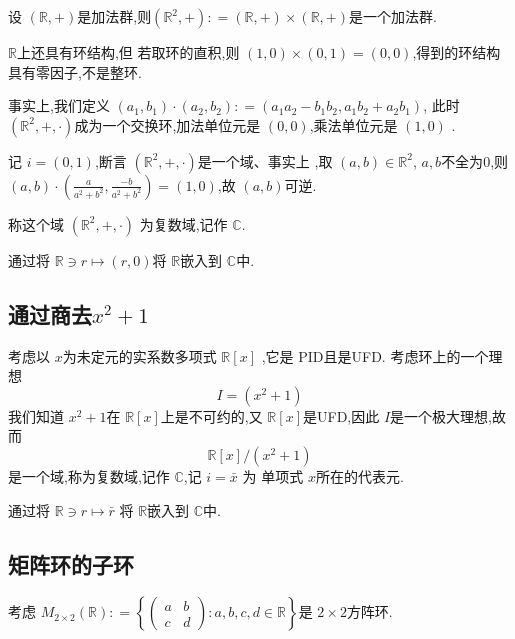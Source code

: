 \documentclass[../../复变函数.tex]{subfiles}
\begin{document}
设 \(  \left( \mathbb{R} ,+  \right)   \)是加法群,则\(  \left( \mathbb{R} ^{2},+  \right): =  \left( \mathbb{R} ,+  \right)\times \left( \mathbb{R} ,+  \right)     \)是一个加法群.  

 \(  \mathbb{R}   \)上还具有环结构,但 若取环的直积,则 \(  \left( 1,0 \right)\times \left( 0,1 \right)= \left( 0,0 \right)     \),得到的环结构具有零因子,不是整环. 

 事实上,我们定义 \(  \left( a_1,b_1 \right)\cdot \left( a_2,b_2 \right): =  \left( a_1a_2-b_1b_2,a_1b_2+ a_2b_1 \right)     \), 此时 
 \(  \left( \mathbb{R} ^{2},+ ,\cdot  \right)   \)成为一个交换环,加法单位元是 \(  \left( 0,0 \right)   \),乘法单位元是 \(  \left( 1,0 \right)   \)  . 

 记 \(  i =  \left( 0,1 \right)   \),断言 \(  \left( \mathbb{R} ^{2},+ ,\cdot  \right)   \)是一个域、事实上
 ,取 \(  \left( a,b  \right) \in \mathbb{R} ^{2}   \), \(  a,b  \)不全为\(  0  \),则 \(  \left( a,b \right)\cdot \left( \frac{a }{a^{2}+ b^{2} }  , \frac{-b }{a^{2}+ b^{2} } \right)= \left( 1,0 \right)     \),故 \(  \left( a,b \right)   \)可逆.
 
 称这个域 \(  \left( \mathbb{R} ^{2},+ ,\cdot  \right)   \)  为复数域,记作 \(  \mathbb{C}   \).
 
 通过将 \(  \mathbb{R} \ni r \mapsto \left( r,0 \right)   \)将 \(  \mathbb{R}   \)嵌入到 \(  \mathbb{C}   \)中.   

\subsection{通过商去\(  x^{2}+ 1  \) }

考虑以 \(  x  \)为未定元的实系数多项式  \(  \mathbb{R} [x]  \) ,它是 PID且是UFD.
考虑环上的一个理想 \[
I =  \left( x^{2}+ 1 \right) 
\]我们知道 \(  x^{2}+ 1  \)在 \(  \mathbb{R} [x]  \)上是不可约的,又 \(  \mathbb{R} [x]  \)是UFD,因此 \(  I  \)是一个极大理想,故而 \[
\mathbb{R} [x]/ \left( x^{2}+ 1 \right) 
\]是一个域,称为复数域,记作 \(  \mathbb{C}   \),记 \(  i =  \bar{x}  \) 为 单项式 \(  x  \)所在的代表元.  

通过将 \( \mathbb{R}  \ni r \mapsto \bar{r}  \) 将 \(  \mathbb{R}   \)嵌入到 \(  \mathbb{C}   \)中.  
\subsection{矩阵环的子环} 

考虑 \(  M_{2\times 2}\left( \mathbb{R}  \right) : =  \left\{ \begin{pmatrix} 
    a&b\\ 
     c&d 
\end{pmatrix}  : a,b,c,d \in \mathbb{R} \right\}   \)是 \(  2\times 2  \)方阵环.
\end{document}
